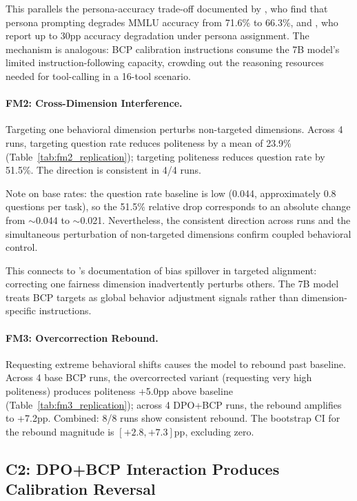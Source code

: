 \documentclass[11pt,a4paper]{article}
\newcommand{\fm}[1]{\textsc{FM#1}}
\newcommand{\bcp}{\textsc{BCP}}
\begin{document}
This parallels the persona-accuracy trade-off documented by \citet{basil2025playing_pretend}, who find that persona prompting degrades MMLU accuracy from 71.6\% to 66.3\%, and \citet{hu2026expert_persona}, who report up to 30pp accuracy degradation under persona assignment.
The mechanism is analogous: \bcp{} calibration instructions consume the 7B model's limited instruction-following capacity, crowding out the reasoning resources needed for tool-calling in a 16-tool scenario.

\paragraph{\fm{2}: Cross-Dimension Interference.}
Targeting one behavioral dimension perturbs non-targeted dimensions.
Across 4 runs, targeting question rate reduces politeness by a mean of 23.9\% (Table~\ref{tab:fm2_replication}); targeting politeness reduces question rate by 51.5\%.
The direction is consistent in 4/4 runs.

Note on base rates: the question rate baseline is low (0.044, approximately 0.8 questions per task), so the 51.5\% relative drop corresponds to an absolute change from $\sim$0.044 to $\sim$0.021.
Nevertheless, the consistent direction across runs and the simultaneous perturbation of non-targeted dimensions confirm coupled behavioral control.

This connects to \citet{gupta2026intra_fairness}'s documentation of bias spillover in targeted alignment: correcting one fairness dimension inadvertently perturbs others.
The 7B model treats \bcp{} targets as global behavior adjustment signals rather than dimension-specific instructions.

\paragraph{\fm{3}: Overcorrection Rebound.}
Requesting extreme behavioral shifts causes the model to rebound past baseline.
Across 4 base \bcp{} runs, the overcorrected variant (requesting very high politeness) produces politeness +5.0pp above baseline (Table~\ref{tab:fm3_replication}); across 4 DPO+\bcp{} runs, the rebound amplifies to +7.2pp.
Combined: 8/8 runs show consistent rebound.
The bootstrap CI for the rebound magnitude is $[+2.8, +7.3]$pp, excluding zero.

\subsection{C2: DPO+\bcp{} Interaction Produces Calibration Reversal}
\label{sec:results_c2}
\end{document}

